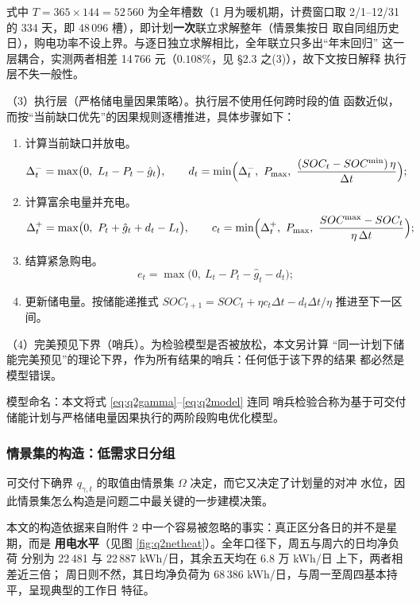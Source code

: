 \documentclass[withoutpreface]{cumcmthesis}
\renewcommand{\emph}[1]{\textbf{#1}}
\begin{document}
\noindent 式中 $T=365\times144=52\,560$ 为全年槽数（1 月为暖机期，计费窗口取
2/1--12/31 的 334 天，即 48\,096 槽），即计划\emph{一次}联立求解整年（情景集按日
取自同组历史日），购电功率不设上界。与逐日独立求解相比，全年联立只多出“年末回归”
这一层耦合，实测两者相差 14\,766 元（$0.108\%$，见 \S2.3 之(3)），故下文按日解释
执行层不失一般性。

\noindent（3）执行层（严格储电量因果策略）。执行层不使用任何跨时段的值
函数近似，而按“当前缺口优先”的因果规则逐槽推进，具体步骤如下：

\begin{enumerate}[label=Step \arabic*., leftmargin=*, itemsep=2pt, topsep=3pt]
  \item 计算当前缺口并放电。
        \[
        \Delta_t^{-}=\max\bigl(0,\ L_t-P_t-\hat g_t\bigr),\qquad
        d_t=\min\Bigl(\Delta_t^{-},\ P_{\max},\
                 \frac{(SOC_t-SOC^{\min})\,\eta}{\Delta t}\Bigr);
        \]
  \item 计算富余电量并充电。
        \[
        \Delta_t^{+}=\max\bigl(0,\ P_t+\hat g_t+d_t-L_t\bigr),\qquad
        c_t=\min\Bigl(\Delta_t^{+},\ P_{\max},\
                 \frac{SOC^{\max}-SOC_t}{\eta\,\Delta t}\Bigr);
        \]
  \item 结算紧急购电。
        \[
        e_t=\max\bigl(0,\ L_t-P_t-\hat g_t-d_t\bigr);
        \]
  \item 更新储电量。按储能递推式
        $SOC_{t+1}=SOC_t+\eta c_t\Delta t-d_t\Delta t/\eta$ 推进至下一区间。
\end{enumerate}

\noindent（4）完美预见下界（哨兵）。为检验模型是否被放松，本文另计算
“同一计划下储能完美预见”的理论下界，作为所有结果的哨兵：任何低于该下界的结果
都必然是模型错误。

\noindent 模型命名：本文将式 \eqref{eq:q2gamma}--\eqref{eq:q2model} 连同
哨兵检验合称为基于可交付储能计划与严格储电量因果执行的两阶段购电优化模型。

\subsubsection{情景集的构造：低需求日分组}
\label{sec:q2scen}

可交付下确界 $q_{\gamma,t}$ 的取值由情景集 $\Omega$ 决定，而它又决定了计划量的对冲
水位，因此情景集怎么构造是问题二中最关键的一步建模决策。

本文的构造依据来自附件 2 中一个容易被忽略的事实：真正区分各日的并不是星期，而是
\emph{用电水平}（见图 \ref{fig:q2netheat}）。全年口径下，周五与周六的日均净负荷
分别为 22\,481 与 22\,887 kWh/日，其余五天均在 6.8 万 kWh/日 上下，两者相差近三倍；
周日则不然，其日均净负荷为 68\,386 kWh/日，与周一至周四基本持平，呈现典型的工作日
特征。
\end{document}
